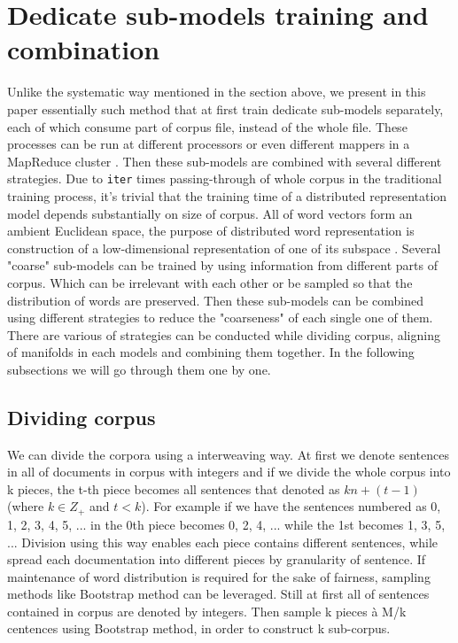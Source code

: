 \documentclass[11pt,a4paper]{article}
\begin{document}
\section{Dedicate sub-models training and combination}
Unlike the systematic way mentioned in the section above, we present in this paper essentially such method that at first train dedicate sub-models separately, each of which consume part of corpus file, instead of the whole file. These processes can be run at different processors or even different mappers in a MapReduce cluster \cite{dean2008mapreduce}. Then these sub-models are combined with several different strategies. Due to \verb|iter| times passing-through of whole corpus in the traditional training process, it's trivial that the training time of a distributed representation model depends substantially on size of corpus. All of word vectors form an ambient Euclidean space, the purpose of distributed word representation is construction of a low-dimensional representation of one of its subspace \cite{Mahadevan2015reasoning}. Several "coarse" sub-models can be trained by using information from different parts of corpus. Which can be irrelevant with each other or be sampled so that the distribution of words are preserved. Then these sub-models can be combined using different strategies to reduce the "coarseness" of each single one of them. There are various of strategies can be conducted while dividing corpus, aligning of manifolds in each models and combining them together. In the following subsections we will go through them one by one.

  \subsection{Dividing corpus}
  We can divide the corpora using a interweaving way. At first we denote sentences in all of documents in corpus with integers and if we divide the whole corpus into k pieces, the t-th piece becomes all sentences that denoted as $kn+(t-1)$ (where $k\in Z_+$ and $t<k$). For example if we have the sentences numbered as 0, 1, 2, 3, 4, 5, ... in the 0th piece becomes 0, 2, 4, ... while the 1st becomes 1, 3, 5, ... Division using this way enables each piece contains different sentences, while spread each documentation into different pieces by granularity of sentence.
  If maintenance of word distribution is required for the sake of fairness, sampling methods like Bootstrap method \cite{efron1992bootstrap} can be leveraged. Still at first all of sentences contained in corpus are denoted by integers. Then sample k pieces {\`a} M/k centences using Bootstrap method, in order to construct k sub-corpus.
  
\end{document}
